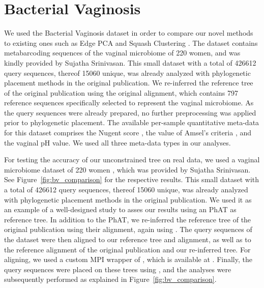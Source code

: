 \section{Bacterial Vaginosis}
\label{supp:sec:DetailsEmpiricalDatasets:sub:BV}

We used the Bacterial Vaginosis dataset \cite{Srinivasan2012} in order to compare our novel methods to
existing ones such as Edge PCA and Squash Clustering \cite{Matsen2011a,Evans2012}.
The dataset contains metabarcoding sequences of the vaginal microbiome of \num{220} women,
and was kindly provided by Sujatha Srinivasan.
This small dataset with a total of \num{426 612} query sequences, thereof \num{15 060} unique,
was already analyzed with phylogenetic placement methods in the original publication.
We re-inferred the reference tree of the original publication using the original alignment,
which contains \num{797} reference sequences specifically selected to represent the vaginal microbiome.
As the query sequences were already prepared,
no further preprocessing was applied prior to phylogenetic placement.
The available per-sample quantitative meta-data for this dataset comprises
the Nugent score \cite{Nugent1991}, the value of Amsel's criteria \cite{Amsel1983}, and the vaginal pH value.
We used all three meta-data types in our analyses.


For testing the accuracy of our unconstrained  tree on real data,
we used a vaginal microbiome dataset of 220 women \citep{Srinivasan2012},
which was provided by Sujatha Srinivasan.
See Figure~\ref{fig:bv_comparison} for the respective results.
This small dataset with a total of \num{426 612} query sequences, thereof \num{15 060} unique,
was already analyzed with phylogenetic placement methods in the original publication.
We used it as an example of a well-designed study to asses our results using an \ac{PhAT} as reference tree.
In addition to the  \ac{PhAT},
we re-inferred the reference tree of the original publication using their alignment,
again using  \citep{Stamatakis2014}.
The query sequences of the dataset were then aligned to our reference tree and alignment,
as well as to the reference alignment of the original publication and our re-inferred tree.
For aligning, we used a custom MPI wrapper of  \citep{Berger2011a,Berger2012},
which is available at \citep{PaPaRaMPI}.
Finally, the query sequences were placed on these trees using  \citep{Barbera2018},
and the analyses were subsequently performed as explained in Figure~\ref{fig:bv_comparison}.

